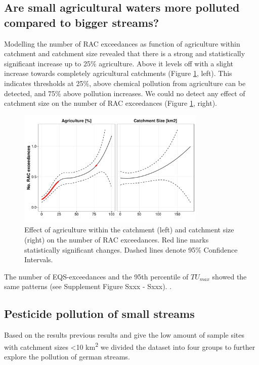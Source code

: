 \documentclass[journal=esthag,manuscript=article]{achemso}
\begin{document}
\subsection{Are small agricultural waters more polluted compared to bigger streams?}

Modelling the number of RAC exceedances as function of agriculture within catchment and catchment size revealed that there is a strong and statistically significant increase up to 25\% agriculture.
Above it levels off with a slight increase towards completely agricultural catchments (Figure \ref{fig:figrac}, left).
This indicates thresholds at 25\%, above chemical pollution from agriculture can be detected, and 75\% above pollution increases. 
We could no detect any effect of catchment size on the number of RAC exceedances (Figure \ref{fig:figrac}, right). 

\begin{figure} [h]
  \includegraphics[width=0.8\textwidth]{fig/figrac.pdf}
  \caption{Effect of agriculture within the catchment (left) and catchment size (right) on the number of RAC exceedances. Red line marks statistically significant changes. Dashed lines denote 95\% Confidence Intervals.
  }
  \label{fig:figrac}
\end{figure}

The number of EQS-exceedances and the 95th percentile of $TU_{max}$ showed the same patterns (see Supplement Figure Sxxx - Sxxx). .


\subsection{Pesticide pollution of small streams}
Based on the results previous results and give the low amount of sample sites with catchment sizes \textless 10 km\textsuperscript{2} we divided the dataset into four groups to further explore the pollution of german streams.
\end{document}

